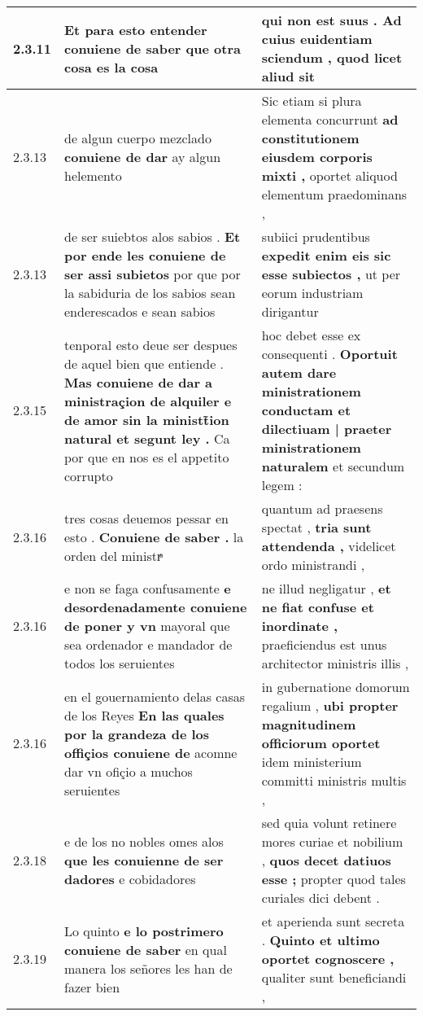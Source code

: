 \begin{tabular}{|p{1cm}|p{6.5cm}|p{6.5cm}|}
2.3.11 & Et para esto entender \textbf{ conuiene de saber } que otra cosa es la cosa & qui non est suus . \textbf{ Ad cuius euidentiam sciendum , } quod licet aliud sit \\\hline
2.3.13 & de algun cuerpo mezclado \textbf{ conuiene de dar } ay algun helemento & Sic etiam si plura elementa concurrunt \textbf{ ad constitutionem eiusdem corporis mixti , } oportet aliquod elementum praedominans , \\\hline
2.3.13 & de ser suiebtos alos sabios . \textbf{ Et por ende les conuiene de ser assi subietos } por que por la sabiduria de los sabios sean enderescados e sean sabios & subiici prudentibus \textbf{ expedit enim eis sic esse subiectos , } ut per eorum industriam dirigantur \\\hline
2.3.15 & tenporal esto deue ser despues de aquel bien que entiende . \textbf{ Mas conuiene de dar a ministraçion de alquiler e de amor sin la ministt̃ion natural et segunt ley . } Ca por que en nos es el appetito corrupto & hoc debet esse ex consequenti . \textbf{ Oportuit autem dare ministrationem conductam et dilectiuam | praeter ministrationem naturalem } et secundum legem : \\\hline
2.3.16 & tres cosas deuemos pessar en esto . \textbf{ Conuiene de saber . } la orden del ministrͣ & quantum ad praesens spectat , \textbf{ tria sunt attendenda , } videlicet ordo ministrandi , \\\hline
2.3.16 & e non se faga confusamente \textbf{ e desordenadamente conuiene de poner y vn } mayoral que sea ordenador e mandador de todos los seruientes & ne illud negligatur , \textbf{ et ne fiat confuse et inordinate , } praeficiendus est unus architector ministris illis , \\\hline
2.3.16 & en el gouernamiento delas casas de los Reyes \textbf{ En las quales por la grandeza de los offiçios conuiene de } acomne dar vn ofiçio a muchos seruientes & in gubernatione domorum regalium , \textbf{ ubi propter magnitudinem officiorum oportet } idem ministerium committi ministris multis , \\\hline
2.3.18 & e de los no nobles omes alos \textbf{ que les conuienne de ser dadores } e cobidadores & sed quia volunt retinere mores curiae et nobilium , \textbf{ quos decet datiuos esse ; } propter quod tales curiales dici debent . \\\hline
2.3.19 & Lo quinto \textbf{ e lo postrimero conuiene de saber } en qual manera los señores les han de fazer bien & et aperienda sunt secreta . \textbf{ Quinto et ultimo oportet cognoscere , } qualiter sunt beneficiandi , \\\hline

\end{tabular}
